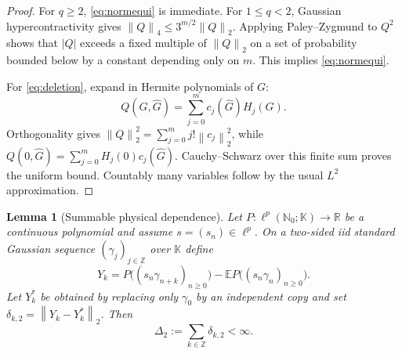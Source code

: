 \documentclass[11pt]{article}
\newtheorem{lemma}{Lemma}
\newcommand{\N}{\mathbb N}
\newcommand{\R}{\mathbb R}
\newcommand{\K}{\mathbb K}
\newcommand{\E}{\mathbb E}
\newcommand{\ellp}{\ell^p(\N_0;\K)}
\newcommand{\norm}[1]{\left\lVert #1\right\rVert}
\begin{document}
\begin{proof}
For $q\ge2$, \eqref{eq:normequi} is immediate.  For $1\le q<2$, Gaussian hypercontractivity gives
$\norm Q_4\le3^{m/2}\norm Q_2$.  Applying Paley--Zygmund to $Q^2$ shows that $|Q|$ exceeds a fixed multiple of $\norm Q_2$ on a set of probability bounded below by a constant depending only on $m$.  This implies \eqref{eq:normequi}.

For \eqref{eq:deletion}, expand in Hermite polynomials of $G$:
\[
 Q(G,\widehat G)=\sum_{j=0}^m c_j(\widehat G)H_j(G).
\]
Orthogonality gives
$\norm Q_2^2=\sum_{j=0}^m j!\norm{c_j}_2^2$, while
$Q(0,\widehat G)=\sum_{j=0}^mH_j(0)c_j(\widehat G)$.  Cauchy--Schwarz over this finite sum proves the uniform bound.  Countably many variables follow by the usual $L^2$ approximation.
\end{proof}

\begin{lemma}[Summable physical dependence]\label{lem:physical}
Let $P:\ellp\to\R$ be a continuous polynomial and assume $s=(s_n)\in\ell^p$.  On a two-sided iid standard Gaussian sequence $(\gamma_j)_{j\in\mathbb Z}$ over $\K$ define
\[
 Y_k=P\bigl((s_n\gamma_{n+k})_{n\ge0}\bigr)-
 \E P\bigl((s_n\gamma_n)_{n\ge0}\bigr).
\]
Let $Y_k^*$ be obtained by replacing only $\gamma_0$ by an independent copy and set $\delta_{k,2}=\norm{Y_k-Y_k^*}_2$.  Then
\[
 \Delta_2:=\sum_{k\in\mathbb Z}\delta_{k,2}<\infty.
\]
\end{lemma}
\end{document}
